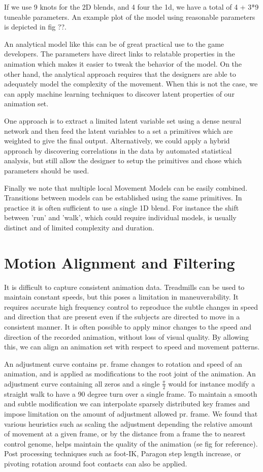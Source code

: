 If we use 9 knots for the 2D blends, and 4 four the 1d, we have a total of 4 + 3*9 tuneable parameters. An example plot of the model using reasonable parameters is depicted in fig ??.

An analytical model like this can be of great practical use to the game developers. The parameters have direct links to relatable properties in the animation which makes it easier to tweak the behavior of the model. On the other hand, the analytical approach requires that the designers are able to adequately model the complexity of the movement. When this is not the case, we can apply machine learning techniques to discover latent properties of our animation set. 

One approach is to extract a limited latent variable set using a dense neural network and then feed the latent variables to a set a primitives which are weighted to give the final output. 
Alternatively, we could apply a hybrid approach by discovering correlations in the data by automated statistical analysis, but still allow the designer to setup the primitives and chose which parameters should be used. 

Finally we note that multiple local Movement Models can be easily combined. Transitions between models can be established using the same primitives. In practice it is often sufficient to use a single 1D blend. For instance the shift between 'run' and 'walk', which could require individual models, is usually distinct and of limited complexity and duration. 

\section{Motion Alignment and Filtering}
It is difficult to capture consistent animation data. Treadmills can be used to maintain constant speeds, but this poses a limitation in maneuverability. It requires accurate high frequency control to reproduce the subtle changes in speed and direction that are present even if the subjects are directed to move in a consistent manner. It is often possible to apply minor changes to the speed and direction of the recorded animation, without loss of visual quality. By allowing this, we can align an animation set with respect to speed and movement patterns. 

An adjustment curve contains pr. frame changes to rotation and speed of an animation, and is applied as modifications to the root joint of the animation. An adjustment curve containing all zeros and a single $\frac{\pi}{2}$ would for instance modify a straight walk to have a 90 degree turn over a single frame. To maintain a smooth and subtle modification we can interpolate sparsely distributed key frames and impose limitation on the amount of adjustment allowed pr. frame. We found that various heuristics such as scaling the adjustment depending the relative amount of movement at a given frame, or by the distance from a frame the to nearest control genome, helps maintain the quality of the animation (se fig for reference). Post processing techniques such as foot-IK, Paragon step length increase, or pivoting rotation around foot contacts can also be applied.

